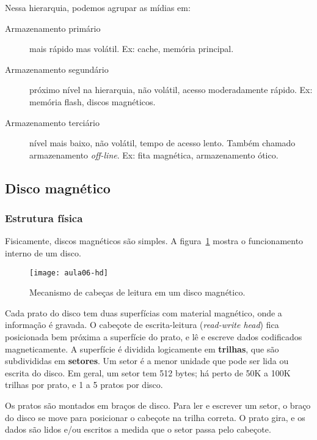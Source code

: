 Nessa hierarquia, podemos agrupar as mídias em:
\begin{description}
\item[Armazenamento primário] mais rápido mas volátil. Ex: cache, memória principal.

\item[Armazenamento segundário] próximo nível na hierarquia, não volátil,
acesso moderadamente rápido. Ex: memória flash, discos magnéticos.

\item[Armazenamento terciário] nível mais baixo, não volátil, tempo de acesso
lento. Também chamado armazenamento \emph{off-line}. Ex: fita magnética, armazenamento ótico.
\end{description}

\subsection{Disco magnético}

\subsubsection{Estrutura física}

Fisicamente, discos magnéticos são simples.
A figura~\ref{aula06:fig:hd} mostra o funcionamento interno de um disco.
%
\begin{figure}[!htb]
\centering
\texttt{[image: aula06-hd]}
\caption{Mecanismo de cabeças de leitura em um disco magnético.}
\label{aula06:fig:hd}
\end{figure}

Cada prato do disco tem duas superfícias com material magnético, onde a informação
é gravada.
O cabeçote de escrita-leitura (\emph{read-write head}) fica posicionada bem 
próxima a superfície do prato, e lê e escreve dados codificados magneticamente.
A superfície é dividida logicamente em {\bf trilhas}, que são subdivididas em 
\textbf{setores}. 
Um setor é a menor unidade que pode ser lida ou escrita do disco.
Em geral, um setor tem 512 bytes; há perto de 50K a 100K trilhas por prato, e 1
a 5 pratos por disco.

Os pratos são montados em braços de disco.
Para ler e escrever um setor, o braço do disco se move para posicionar o cabeçote
na trilha correta.
O prato gira, e os dados são lidos e/ou escritos a medida que o setor
passa pelo cabeçote.

